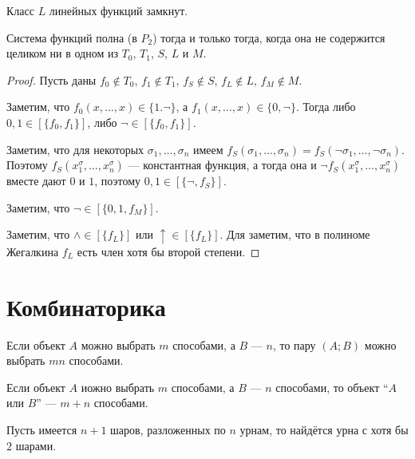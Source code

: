 \documentclass[12pt,a4paper]{article}
\begin{document}
    \begin{statement}
        Класс $L$ линейных функций замкнут.
    \end{statement}

    \begin{theorem}
        Система функций полна (в $P_2$) тогда и только тогда, когда она не содержится целиком ни в одном из $T_0$, $T_1$, $S$, $L$ и $M$.
    \end{theorem}

    \begin{proof}
        Пусть даны $f_0 \notin T_0$, $f_1 \notin T_1$, $f_S \notin S$, $f_L \notin L$, $f_M \notin M$.

        Заметим, что $f_0(x, \dots, x) \in \{1. \neg\}$, а $f_1(x, \dots, x) \in \{0, \neg\}$. Тогда либо $0, 1 \in [\{f_0, f_1\}]$, либо $\neg \in [\{f_0, f_1\}]$.

        Заметим, что для некоторых $\sigma_1, \dots, \sigma_n$ имеем $f_S(\sigma_1, \dots, \sigma_n) = f_S(\neg\sigma_1, \dots, \neg\sigma_n)$. Поэтому $f_S(x^\sigma_1, \dots, x^\sigma_n)$ --- константная функция, а тогда она и $\neg f_S(x^\sigma_1, \dots, x^\sigma_n)$ вместе дают $0$ и $1$, поэтому $0, 1 \in [\{\neg, f_S\}]$.

        Заметим, что $\neg \in [\{0, 1, f_M\}]$.

        Заметим, что $\wedge \in [\{f_L\}]$ или $\uparrow \in [\{f_L\}]$. Для заметим, что в полиноме Жегалкина $f_L$ есть член хотя бы второй степени.
    \end{proof}

    \section{Комбинаторика}

    \begin{statement}
        Если объект $A$ можно выбрать $m$ способами, а $B$ --- $n$, то пару $(A;B)$ можно выбрать $mn$ способами.
    \end{statement}

    \begin{statement}
        Если объект $A$ иожно выбрать $m$ способами, а $B$ --- $n$ способами, то объект ``$A$ или $B$'' --- $m+n$ способами.
    \end{statement}

    \begin{statement}
        Пусть имеется $n+1$ шаров, разложенных по $n$ урнам, то найдётся урна с хотя бы $2$ шарами.
    \end{statement}
\end{document}
